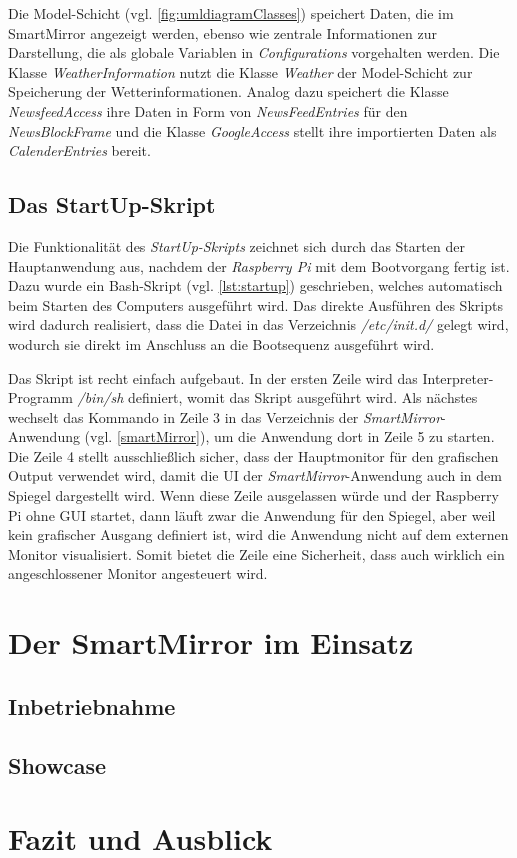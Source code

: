  Die Model-Schicht (vgl. \autoref{fig:umldiagramClasses}) speichert Daten, die im SmartMirror angezeigt werden, ebenso wie zentrale Informationen zur Darstellung, die als globale Variablen in \textit{Configurations} vorgehalten werden. Die Klasse \textit{WeatherInformation} nutzt die Klasse \textit{Weather} der Model-Schicht zur Speicherung der Wetterinformationen. 
 Analog dazu speichert die Klasse \textit{NewsfeedAccess} ihre Daten in Form von \textit{NewsFeedEntries} für den \textit{NewsBlockFrame} und die Klasse \textit{GoogleAccess} stellt ihre importierten Daten  als \textit{CalenderEntries} bereit.
 

\subsection{Das StartUp-Skript}

Die Funktionalität des \textit{StartUp-Skripts} zeichnet sich durch das Starten der Hauptanwendung aus, nachdem der \textit{Raspberry Pi} mit dem Bootvorgang fertig ist. Dazu wurde ein Bash-Skript (vgl. \autoref{lst:startup}) geschrieben, welches automatisch beim Starten des Computers ausgeführt wird. 
Das direkte Ausführen des Skripts wird dadurch realisiert, dass die Datei in das Verzeichnis \textit{/etc/init.d/} gelegt wird, wodurch sie direkt im Anschluss an die Bootsequenz ausgeführt wird. \cite{nemeth2006linux}

\begin{minipage}{\textwidth}
	
\end{minipage} 

Das Skript ist recht einfach aufgebaut. In der ersten Zeile wird das Interpreter-Programm \textit{/bin/sh} definiert, womit das Skript ausgeführt wird. Als nächstes wechselt das Kommando in Zeile 3 in das Verzeichnis der \textit{SmartMirror}-Anwendung (vgl. \autoref{smartMirror}), um die Anwendung dort in Zeile 5 zu starten. Die Zeile 4 stellt ausschließlich sicher, dass der Hauptmonitor für den grafischen Output verwendet wird, damit die UI der \textit{SmartMirror}-Anwendung auch in dem Spiegel dargestellt wird. Wenn diese Zeile ausgelassen würde und der Raspberry Pi ohne GUI startet, dann läuft zwar die Anwendung für den Spiegel, aber weil kein grafischer Ausgang definiert ist, wird die Anwendung nicht auf dem externen Monitor visualisiert. Somit bietet die Zeile eine Sicherheit, dass auch wirklich ein angeschlossener Monitor angesteuert wird.

\section{Der SmartMirror im Einsatz}
\subsection{Inbetriebnahme}
\subsection{Showcase}

\section{Fazit und Ausblick}
